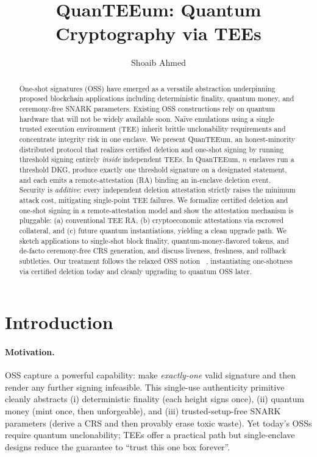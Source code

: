\documentclass[runningheads,orivec]{llncs}
\newcommand{\prot}{\textsf{QuanTEEum}}
\begin{document}
\title{QuanTEEum: Quantum Cryptography via TEEs}
\author{Shoaib Ahmed}
\maketitle

\begin{abstract}
One-shot signatures (OSS) have emerged as a versatile abstraction underpinning proposed blockchain applications including deterministic finality, quantum money, and ceremony-free SNARK parameters. Existing OSS constructions rely on quantum hardware that will not be widely available soon. Naïve emulations using a single trusted execution environment (TEE) inherit brittle unclonability requirements and concentrate integrity risk in one enclave. We present \prot{}, an honest-minority distributed protocol that realizes certified deletion and one-shot signing by running threshold signing entirely \emph{inside} independent TEEs. In \prot{}, $n$ enclaves run a threshold DKG, produce exactly one threshold signature on a designated statement, and each emits a remote-attestation (RA) binding an in-enclave deletion event. Security is \emph{additive}: every independent deletion attestation strictly raises the minimum attack cost, mitigating single-point TEE failures. We formalize certified deletion and one-shot signing in a remote-attestation model and show the attestation mechanism is pluggable: (a) conventional TEE RA, (b) cryptoeconomic attestations via escrowed collateral, and (c) future quantum instantiations, yielding a clean upgrade path. We sketch applications to single-shot block finality, quantum-money-flavored tokens, and de-facto ceremony-free CRS generation, and discuss liveness, freshness, and rollback subtleties.
Our treatment follows the relaxed OSS notion ~\cite{pkc-2024-34093}, instantiating one-shotness via certified deletion today and cleanly upgrading to quantum OSS later.
\end{abstract}

\section{Introduction}
\paragraph{Motivation.}
OSS capture a powerful capability: make \emph{exactly-one} valid signature and then render any further signing infeasible. This single-use authenticity primitive cleanly abstracts (i) deterministic finality (each height signs once), (ii) quantum money (mint once, then unforgeable), and (iii) trusted-setup-free SNARK parameters (derive a CRS and then provably erase toxic waste). Yet today’s OSSs require quantum unclonability; TEEs offer a practical path but single-enclave designs reduce the guarantee to “trust this one box forever”.
\end{document}
